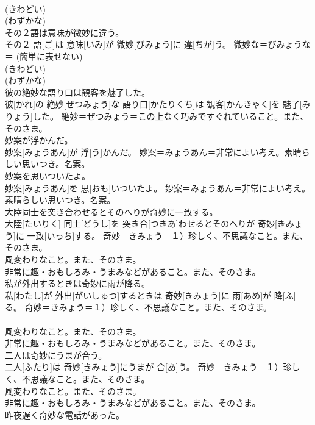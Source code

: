 \documentclass[8pt]{extreport}
\begin{document}
\begin{CJK}{UTF8}{min}
{\\	(きわどい) 
\\	(わずかな) 
\\	その２語は意味が微妙に違う。	
\\	その２ 語[ご]は 意味[いみ]が 微妙[びみょう]に 違[ちが]う。	微妙な＝びみょうな＝ (簡単に表せない) 
\\	(きわどい) 
\\	(わずかな) 
\\	彼の絶妙な語り口は観客を魅了した。	
\\	彼[かれ]の 絶妙[ぜつみょう]な 語り口[かたりくち]は 観客[かんきゃく]を 魅了[みりょう]した。	絶妙＝ぜつみょう＝この上なく巧みですぐれていること。また、そのさま。
\\	妙案が浮かんだ。	
\\	妙案[みょうあん]が 浮[う]かんだ。	妙案＝みょうあん＝非常によい考え。素晴らしい思いつき。名案。
\\	妙案を思いついたよ。	
\\	妙案[みょうあん]を 思[おも]いついたよ。	妙案＝みょうあん＝非常によい考え。素晴らしい思いつき。名案。
\\	大陸同士を突き合わせるとそのへりが奇妙に一致する。	
\\	大陸[たいりく] 同士[どうし]を 突き合[つきあ]わせるとそのへりが 奇妙[きみょう]に 一致[いっち]する。	奇妙＝きみょう＝１）珍しく、不思議なこと。また、そのさま。 　　　　　　　　
\\	風変わりなこと。また、そのさま。 　　　　　　　　
\\	非常に趣・おもしろみ・うまみなどがあること。また、そのさま。
\\	私が外出するときは奇妙に雨が降る。	
\\	私[わたし]が 外出[がいしゅつ]するときは 奇妙[きみょう]に 雨[あめ]が 降[ふ]る。	奇妙＝きみょう＝１）珍しく、不思議なこと。また、そのさま。 　　　　　　　　
\\	風変わりなこと。また、そのさま。 　　　　　　　　
\\	非常に趣・おもしろみ・うまみなどがあること。また、そのさま。
\\	二人は奇妙にうまが合う。	
\\	二人[ふたり]は 奇妙[きみょう]にうまが 合[あ]う。	奇妙＝きみょう＝１）珍しく、不思議なこと。また、そのさま。 　　　　　　　　
\\	風変わりなこと。また、そのさま。 　　　　　　　　
\\	非常に趣・おもしろみ・うまみなどがあること。また、そのさま。
\\	昨夜遅く奇妙な電話があった。	
}
\end{CJK}
\end{document}
